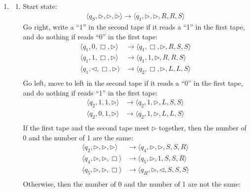 \documentclass[12pt,a4paper]{article}
\makeatletter
\newtheorem*{solution}{Solution}
\theoremstyle{definition}
\renewenvironment{solution}[1][Solution] {\par\pushQED{\qed}\normalfont\topsep6\p@\@plus6\p@\relax\trivlist\item[\hskip\labelsep\bfseries#1\@addpunct{.}]\ignorespaces}{\popQED\endtrivlist\@endpefalse} \makeatother
\makeatother
\begin{document}
\begin{enumerate}
	\begin{solution}
		\begin{enumerate}
			\item Start state:
			\begin{align*}
				\langle q_S, \triangleright, \triangleright, \triangleright \rangle \rightarrow \langle q_1, \triangleright,\triangleright,  R, R, S \rangle
			\end{align*}
			Go right, write a ``1'' in the second tape if it reads a ``1'' in the first tape, and do nothing if reads ``0'' in the first tape:
			\begin{align*}
				\langle q_1, 0, \Box, \triangleright \rangle &\rightarrow \langle q_1, \Box,\triangleright,  R, S, S \rangle\\
				\langle q_1, 1, \Box, \triangleright \rangle &\rightarrow \langle q_1, 1,\triangleright,  R, R, S \rangle\\
				\langle q_1, \triangleleft, \Box, \triangleright \rangle &\rightarrow \langle q_2, \Box, \triangleright,  L, L, S \rangle\\
			\end{align*}
			Go left, move to left in the second tape if it reads a ``0'' in the first tape, and do nothing if reads ``1'' in the first tape:
			\begin{align*}
				\langle q_2, 1, 1, \triangleright \rangle &\rightarrow \langle q_2, 1,\triangleright,  L, S, S \rangle\\
				\langle q_2, 0, 1, \triangleright \rangle &\rightarrow \langle q_2, 1,\triangleright,  L, L, S \rangle\\
			\end{align*}
			If the first tape and the second tape meet $ \triangleright $ together, then the number of 0 and the number of 1 are the same:
			\begin{align*}
				\langle q_2, \triangleright, \triangleright, \triangleright \rangle &\rightarrow \langle q_4, \triangleright,\triangleright,  S, S, R \rangle\\
				\langle q_4, \triangleright, \triangleright, \Box \rangle &\rightarrow \langle q_5, \triangleright,1,  S, S, R \rangle\\
				\langle q_5, \triangleright, \triangleright, \Box \rangle &\rightarrow \langle q_H, \triangleright,\triangleleft,  S, S, S \rangle\\
			\end{align*}
			Otherwise, then the number of 0 and the number of 1 are not the same:
			\begin{align*}

\end{align*}
\end{enumerate}
\end{solution}
\end{enumerate}
\end{document}
